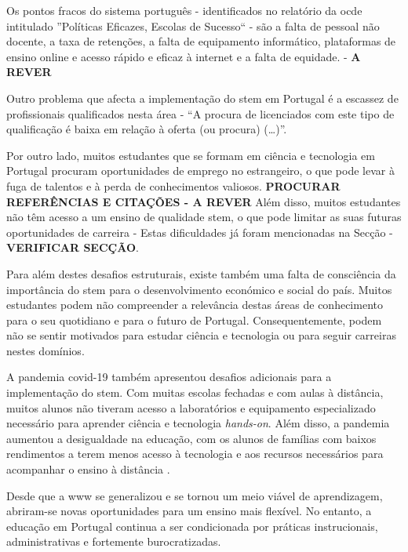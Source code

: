 Os pontos fracos do sistema português - identificados no relatório da \acrshort{ocde} intitulado ''Políticas Eficazes, Escolas de Sucesso`` - são a falta de pessoal não docente, a taxa de retenções, a falta de equipamento informático, plataformas de ensino online e acesso rápido e eficaz à internet e a falta de equidade. - \textbf{A REVER}

Outro problema que afecta a implementação do \acrshort{stem} em Portugal é a escassez de profissionais qualificados nesta área \cite{Qualific91:online} - ``A procura de licenciados com este tipo de qualificação é baixa em relação à oferta (ou procura) (\ldots)''. 

Por outro lado, muitos estudantes que se formam em ciência e tecnologia em Portugal procuram oportunidades de emprego no estrangeiro, o que pode levar à fuga de talentos e à perda de conhecimentos valiosos. \textbf{PROCURAR REFERÊNCIAS E CITAÇÕES - A REVER} Além disso, muitos estudantes não têm acesso a um ensino de qualidade \acrshort{stem}, o que pode limitar as suas futuras oportunidades de carreira - Estas dificuldades já foram mencionadas na Secção - \textbf{VERIFICAR SECÇÃO}.

Para além destes desafios estruturais, existe também uma falta de consciência da importância do \acrshort{stem} para o desenvolvimento económico e social do país. Muitos estudantes podem não compreender a relevância destas áreas de conhecimento para o seu quotidiano e para o futuro de Portugal. Consequentemente, podem não se sentir motivados para estudar ciência e tecnologia ou para seguir carreiras nestes domínios.

A pandemia \acrshort{covid-19} também apresentou desafios adicionais para a implementação do \acrshort{stem}. Com muitas escolas fechadas e com aulas à distância, muitos alunos não tiveram acesso a laboratórios e equipamento especializado necessário para aprender ciência e tecnologia \textit{hands-on}. Além disso, a pandemia aumentou a desigualdade na educação, com os alunos de famílias com baixos rendimentos a terem menos acesso à tecnologia e aos recursos necessários para acompanhar o ensino à distância \cite{desigualdadespandemia}\cite{efeitospandemiadigital}. 

Desde que a \acrfull{www} se generalizou e se tornou um meio viável de aprendizagem, abriram-se novas oportunidades para um ensino mais flexível. No entanto, a educação em Portugal continua a ser condicionada por práticas instrucionais, administrativas e fortemente burocratizadas.

